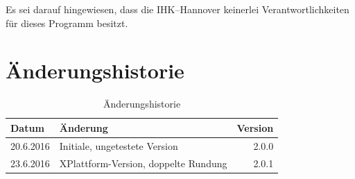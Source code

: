 \documentclass[a4paper,notitlepage,parskip=half]{scrartcl}
\begin{document}
Es sei darauf hingewiesen, dass die IHK--Hannover keinerlei Verantwortlichkeiten für dieses Programm besitzt.
\section{Änderungshistorie}
\begin{table}[H]\centering
\begin{tabular}{|l|l|r|}
\hline
Datum & Änderung &Version\\
\hline
20.6.2016&	Initiale, ungetestete Version		&  2.0.0\\
23.6.2016&	XPlattform-Version, doppelte Rundung&  2.0.1\\


\hline
\end{tabular}
\caption{Änderungshistorie}
\end{table}
\end{document}

